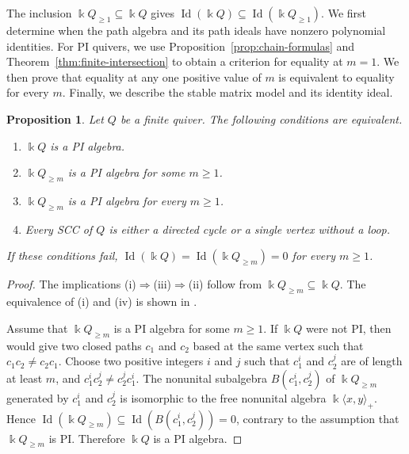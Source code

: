 \documentclass[11pt,reqno]{amsart}
\newcommand{\kk}{\Bbbk}
\newcommand{\Id}{\operatorname{Id}}
\newtheorem{proposition}[theorem]{Proposition}
\theoremstyle{definition}
\theoremstyle{remark}
\numberwithin{equation}{section}
\begin{document}
The inclusion $\kk Q_{\ge1}\subseteq\kk Q$ gives
$\Id(\kk Q)\subseteq\Id(\kk Q_{\ge1})$.
We first determine when the path algebra and its path ideals
have nonzero polynomial identities. 
For PI quivers, we use Proposition~\ref{prop:chain-formulas}
and Theorem~\ref{thm:finite-intersection} to obtain a criterion
for equality at $m=1$.
 We then prove that equality at any one
positive value of $m$ is equivalent to equality for every $m$.
Finally, we describe the stable matrix model and its identity ideal.


\begin{proposition}\label{prop:positive-pi}
Let $Q$ be a finite quiver. The following conditions are equivalent.
\begin{enumerate}
\item $\kk Q$ is a PI algebra.
\item $\kk Q_{\ge m}$ is a PI algebra for some $m\ge1$.
\item $\kk Q_{\ge m}$ is a PI algebra for every $m\ge1$.
\item Every SCC of $Q$ is either a directed
cycle or a single vertex without a loop.
\end{enumerate}
If these conditions fail, $\Id(\kk Q)=\Id(\kk Q_{\ge m})=0$
for every $m\ge1$.
\end{proposition}


\begin{proof}
The implications \textup{(i)}$\Rightarrow$\textup{(iii)}$\Rightarrow$\textup{(ii)}
follow from $\kk Q_{\ge m}\subseteq\kk Q$.
The equivalence of \textup{(i)} and \textup{(iv)} is shown in \cite{CerulliIrelliEtAl2026}.

Assume that $\kk Q_{\ge m}$  is a PI algebra for some $m \ge 1$.
If $\kk Q$ were not PI, 
then
\cite[Theorem~1.1]{CerulliIrelliEtAl2026} would give two 
closed paths $c_1$ and $c_2$ based at the same vertex such that $c_1c_2\ne c_2c_1$.
Choose two positive integers $i$ and $j$ such that $c_1^i$ and $c_2^j$ are of length at least $m$, and $c_1^ic_2^j \neq  c_2^j    c_1^i$.  
The nonunital subalgebra $B(c_1^i,c_2^j)$ of $\kk Q_{\ge m}$
generated by $c_1^i$ and $c_2^j$ is isomorphic to the free
nonunital algebra $\kk\langle x,y\rangle_+$.
Hence
$\Id(\kk Q_{\ge m})\subseteq\Id(B(c_1^i,c_2^j))=0$,
contrary to the assumption that $\kk Q_{\ge m}$ is PI.
Therefore $\kk Q$ is a PI algebra.

\end{proof}
\end{document}
